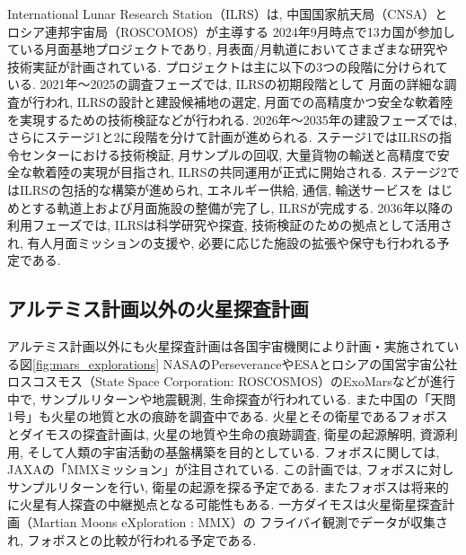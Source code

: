 International Lunar Research Station（ILRS）は, 
中国国家航天局（CNSA）とロシア連邦宇宙局（ROSCOMOS）が主導する
2024年9月時点で13カ国が参加している月面基地プロジェクトであり, 
月表面/月軌道においてさまざまな研究や技術実証が計画されている\cite{ilrs}. 
プロジェクトは主に以下の3つの段階に分けられている. 
2021年～2025の調査フェーズでは, ILRSの初期段階として 
月面の詳細な調査が行われ, ILRSの設計と建設候補地の選定, 
月面での高精度かつ安全な軟着陸を実現するための技術検証などが行われる. 
2026年～2035年の建設フェーズでは, さらにステージ1と2に段階を分けて計画が進められる. 
ステージ1ではILRSの指令センターにおける技術検証, 月サンプルの回収, 
大量貨物の輸送と高精度で安全な軟着陸の実現が目指され, ILRSの共同運用が正式に開始される. 
ステージ2ではILRSの包括的な構築が進められ, エネルギー供給, 通信, 輸送サービスを
はじめとする軌道上および月面施設の整備が完了し, ILRSが完成する. 
2036年以降の利用フェーズでは, ILRSは科学研究や探査, 技術検証のための拠点として活用され, 
有人月面ミッションの支援や, 必要に応じた施設の拡張や保守も行われる予定である. 

\subsection{アルテミス計画以外の火星探査計画}
\label{section:アルテミス計画以外の火星探査計画}
アルテミス計画以外にも火星探査計画は各国宇宙機関により計画・実施されている図\ref{fig:mars_explorations}
NASAのPerseveranceやESAとロシアの国営宇宙公社ロスコスモス（State Space Corporation: ROSCOSMOS）のExoMarsなどが進行中で, 
サンプルリターンや地震観測, 生命探査が行われている. 
また中国の「天問1号」も火星の地質と水の痕跡を調査中である. 
火星とその衛星であるフォボスとダイモスの探査計画は, 火星の地質や生命の痕跡調査, 
衛星の起源解明, 資源利用, そして人類の宇宙活動の基盤構築を目的としている. 
フォボスに関しては, JAXAの「MMXミッション」が注目されている. 
この計画では, フォボスに対しサンプルリターンを行い, 衛星の起源を探る予定である. 
またフォボスは将来的に火星有人探査の中継拠点となる可能性もある. 
一方ダイモスは火星衛星探査計画（Martian Moons eXploration : MMX）の
フライバイ観測でデータが収集され, フォボスとの比較が行われる予定である. 

